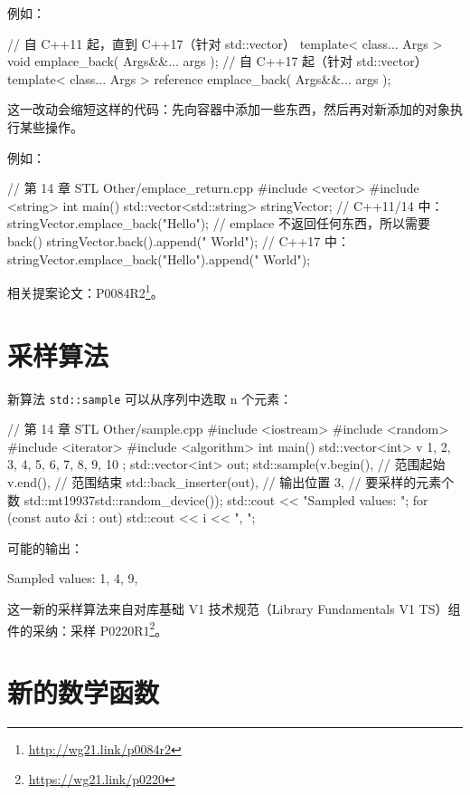 例如：

\begin{codebox}[cpp]
// 自 C++11 起，直到 C++17（针对 std::vector）
template< class... Args >
void emplace_back( Args&&... args );
// 自 C++17 起（针对 std::vector）
template< class... Args >
reference emplace_back( Args&&... args );
\end{codebox}

这一改动会缩短这样的代码：先向容器中添加一些东西，然后再对新添加的对象执行某些操作。

例如：

\begin{codebox}[cpp]
// 第 14 章 STL Other/emplace_return.cpp
#include <vector>
#include <string>
int main() {
std::vector<std::string> stringVector;
// C++11/14 中：
stringVector.emplace_back("Hello");
// emplace 不返回任何东西，所以需要 back()
stringVector.back().append(" World");
// C++17 中：
stringVector.emplace_back("Hello").append(" World");
}
\end{codebox}

相关提案论文：P0084R2\footnote{\url{http://wg21.link/p0084r2}}。


\section{采样算法}

新算法 \texttt{std::sample} 可以从序列中选取 n 个元素：

\begin{codebox}[cpp]
// 第 14 章 STL Other/sample.cpp
#include <iostream>
#include <random>
#include <iterator>
#include <algorithm>
int main() {
std::vector<int> v { 1, 2, 3, 4, 5, 6, 7, 8, 9, 10 };
std::vector<int> out;
std::sample(v.begin(),
// 范围起始
v.end(),
// 范围结束
std::back_inserter(out), // 输出位置
3,
// 要采样的元素个数
std::mt19937{std::random_device{}()});
std::cout << "Sampled values: ";
for (const auto &i : out)
std::cout << i << ", ";
}
\end{codebox}

可能的输出：

\begin{codebox}
Sampled values: 1, 4, 9,
\end{codebox}

这一新的采样算法来自对库基础 V1 技术规范（Library Fundamentals V1 TS）组件的采纳：采样 P0220R1\footnote{\url{https://wg21.link/p0220}}。


\section{新的数学函数}

